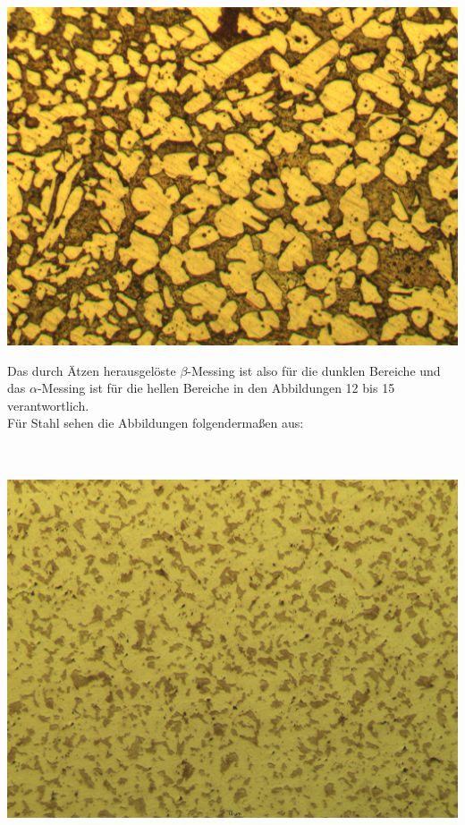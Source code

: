 \documentclass[german,  %
parskip=full,  %
]{scrartcl}
\begin{document}
\begin{minipage}{0.1\textwidth}\centering
\[\]
\end{minipage}
\begin{minipage}{0.45\textwidth}\centering
\includegraphics[scale=0.1]{Me_2Sch_5s_20x_001.jpg}
\end{minipage} 
\newpage
Das durch Ätzen herausgelöste $\beta$-Messing ist also für die dunklen Bereiche und das $\alpha$-Messing ist für die hellen Bereiche in den Abbildungen 12 bis 15 verantwortlich. 
\\
Für Stahl sehen die Abbildungen folgendermaßen aus:
\\\\\\
\begin{minipage}{0.45\textwidth}\centering
\includegraphics[scale=0.1]{St_1Sch_5s_10x_001.jpg}
\end{minipage}
\end{document}
